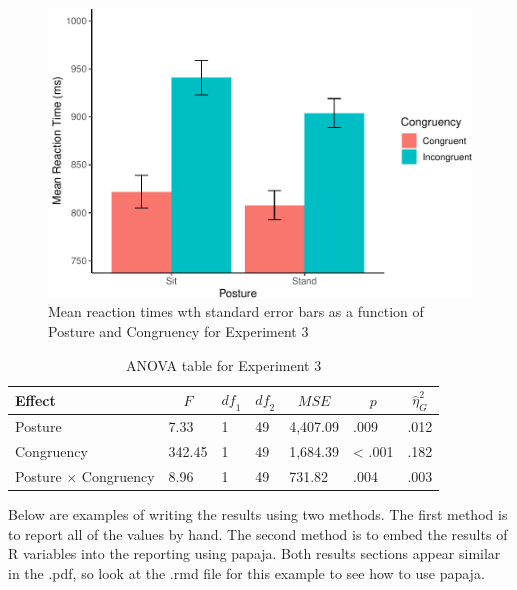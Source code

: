 \documentclass[
  english,
  man]{article}
\begin{document}
\begin{figure}
\centering
\includegraphics{semester-project-example_files/figure-latex/stroopfig-1.pdf}
\caption{\label{fig:stroopfig}Mean reaction times wth standard error bars as a function of Posture and Congruency for Experiment 3}
\end{figure}

\begin{table}[tbp]

\begin{center}
\begin{threeparttable}

\caption{\label{tab:aovtable}ANOVA table for Experiment 3}

\begin{tabular}{lllllll}
\toprule
Effect & \multicolumn{1}{c}{$F$} & \multicolumn{1}{c}{$\mathit{df}_1$} & \multicolumn{1}{c}{$\mathit{df}_2$} & \multicolumn{1}{c}{$\mathit{MSE}$} & \multicolumn{1}{c}{$p$} & \multicolumn{1}{c}{$\hat{\eta}^2_G$}\\
\midrule
Posture & 7.33 & 1 & 49 & 4,407.09 & .009 & .012\\
Congruency & 342.45 & 1 & 49 & 1,684.39 & < .001 & .182\\
Posture $\times$ Congruency & 8.96 & 1 & 49 & 731.82 & .004 & .003\\
\bottomrule
\end{tabular}

\end{threeparttable}
\end{center}

\end{table}

Below are examples of writing the results using two methods. The first method is to report all of the values by hand. The second method is to embed the results of R variables into the reporting using papaja. Both results sections appear similar in the .pdf, so look at the .rmd file for this example to see how to use papaja.
\end{document}
